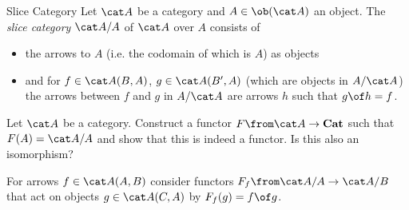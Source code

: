 \begin{definition}{Slice Category}
  Let $\A$ be a category and $A\in\ob(\A)$ an object. The \emph{slice category} $\A/A$ of $\A$ over $A$ consists of
  \begin{itemize}
  \item the arrows to $A$ (i.e. the codomain of which is $A$) as objects
  \item and for $f\in \A(B,A)$, $g\in\A(B',A)$ (which are objects in $A/\A$) the arrows between $f$ and $g$ in $A/\A$ are arrows $h$ such that $g\of h=f$.
  \end{itemize}
\end{definition}

\begin{exercise}
  Let $\A$ be a category. Construct a functor $F\from \A\to\mathbf{Cat}$ such that $F(A)=\A/A$ and show that this is indeed a functor. Is this also an isomorphism?

  \begin{hint}
    For arrows $f\in\A(A,B)$ consider functors $F_f\from\A/A\to\A/B$ that act on objects $g\in \A(C,A)$ by $F_f(g)=f\of g$.
  \end{hint}
\end{exercise}

